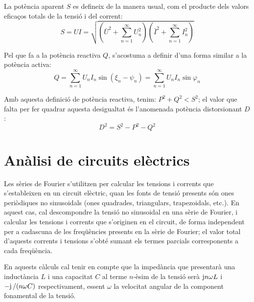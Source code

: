 La potència aparent $S$ es defineix de la manera usual, com el
producte dels valors eficaços totals de la tensió i del corrent:
\begin{equation}
    S = U I = \sqrt{ \left(\bar{U}^2 + \sum_{n=1}^{\infty}U^2_n\right)
    \left(\bar{I}^2 + \sum_{n=1}^{\infty}I^2_n\right) }
\end{equation}

Pel que fa  a la potència reactiva $Q$, s'acostuma  a definir d'una
forma similar a la potència activa:
\begin{equation}
    Q = \sum_{n=1}^\infty U_n I_n
    \sin(\xi_n-\psi_n) =  \sum_{n=1}^\infty U_n I_n
    \sin \varphi_n
\end{equation}

Amb aquesta definició de potència reactiva, tenim: $P^2+Q^2 < S^2$;
el valor que falta per fer quadrar aquesta desigualtat és l'anomenada
potència distorsionant $D$:
\begin{equation}
    D^2 = S^2 - P^2 - Q^2
\end{equation}

\section{Anàlisi de circuits elèctrics}

Les sèries de Fourier s'utilitzen per calcular les tensions i
corrents que s'estableixen en un circuit elèctric, quan les fonts de
tensió presents  són ones periòdiques no sinusoidals (ones
quadrades, triangulars, trapezoidals, etc.). En aquest cas, cal
descompondre la tensió no sinusoidal en una sèrie de Fourier, i
calcular les tensions i corrents que s'originen en el circuit, de
forma independent per a cadascuna de les freqüències presents en la
sèrie de Fourier; el valor total d'aquests corrents i tensions
s'obté sumant els termes parcials corresponents a cada freqüència.

En aquests càlculs cal tenir en compte que la impedància que
presentarà una inductància $L$ i una capacitat $C$ al terme
$n$-èsim de la tensió serà $\mathrm{j} n \omega L$ i $-\mathrm{j}\,/(n\omega C)$
respectivament, essent $\omega$ la velocitat angular de la component
fonamental de la tensió.



